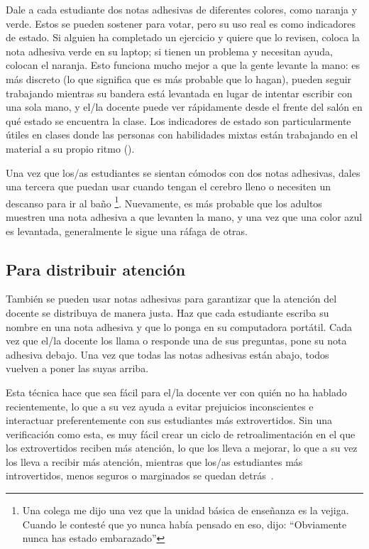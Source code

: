 Dale a cada estudiante dos notas adhesivas de diferentes colores,
como naranja y verde.
Estos se pueden sostener para votar,
pero su uso real es como indicadores de estado.
Si alguien ha completado un ejercicio y quiere que lo revisen,
coloca la nota adhesiva verde en su laptop;
si tienen un problema y necesitan ayuda,
colocan el naranja.
Esto funciona mucho mejor a que la gente levante la mano:
es más discreto (lo que significa que es más probable que lo hagan),
pueden seguir trabajando mientras su bandera está levantada en lugar de intentar escribir con una sola mano,
y el/la docente puede ver rápidamente desde el frente del salón en qué estado se encuentra la clase.
Los indicadores de estado son particularmente útiles en clases donde las personas con habilidades mixtas
están trabajando en el material a su propio ritmo ().

Una vez que los/as estudiantes se sientan cómodos con dos notas adhesivas,
dales una tercera que puedan usar cuando tengan el cerebro lleno
o necesiten un descanso para ir al baño \footnote{Una colega me dijo una vez que
la unidad básica de enseñanza es la vejiga.
Cuando le contesté que yo nunca había pensado en eso,
dijo: ``Obviamente nunca has estado embarazado''}.
Nuevamente,
es más probable que los adultos muestren una nota adhesiva a que levanten la mano,
y una vez que una color azul es levantada,
generalmente le sigue una ráfaga de otras.

\subsection*{Para distribuir atención}

También se pueden usar notas adhesivas para garantizar que la atención del docente se distribuya de manera justa.
Haz que cada estudiante escriba su nombre en una nota adhesiva
y que lo ponga en su computadora portátil.
Cada vez que el/la docente los llama o responde una de sus preguntas,
pone su nota adhesiva debajo.
Una vez que todas las notas adhesivas están abajo,
todos vuelven a poner las suyas arriba.

Esta técnica hace que sea fácil para el/la docente ver con quién no ha hablado recientemente,
lo que a su vez ayuda a evitar prejuicios inconscientes
e interactuar preferentemente con sus estudiantes más extrovertidos.
Sin una verificación como esta,
es muy fácil crear un ciclo de retroalimentación en el que los extrovertidos reciben más atención,
lo que los lleva a mejorar,
lo que a su vez los lleva a recibir más atención,
mientras que los/as estudiantes más introvertidos, menos seguros o marginados se quedan detrás~\cite{Alvi1999,Juss2005}.


